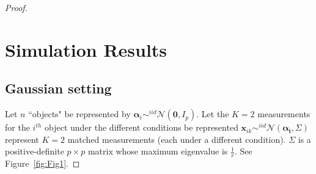 \documentclass[12pt]{article} %
\begin{document}
\begin{proof}

\section{Simulation Results\label{sec:Simulation Results}}
\subsection{Gaussian setting\label{subsec:GaussianSet}}

  Let $n$ ``objects" be represented  by  $\bm{\alpha}_i \sim^{iid} \mathcal{N}(\bm{0},I_p)$.  Let the $K=2$ measurements for the $i^{th}$ object under the different conditions be represented  $\bm{x}_{ik}  \sim^{iid} \mathcal{N}(\bm{\alpha_i},\Sigma)$ represent $K=2$ matched measurements (each under a different condition).
  $\Sigma$ is a positive-definite $p\times p$ matrix whose maximum eigenvalue is   $\frac{1}{r} $. See Figure~\ref{fig:Fig1}.
  

\end{proof}
\end{document}
